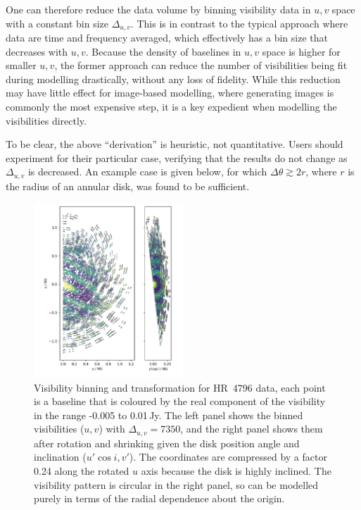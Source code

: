 \documentclass[fleqn,usenatbib]{mnras}
\begin{document}
One can therefore reduce the data volume by binning visibility data in $u,v$ space with a constant bin size $\Delta_{u,v}$. This is in contrast to the typical approach where data are time and frequency averaged, which effectively has a bin size that decreases with $u,v$. Because the density of baselines in $u,v$ space is higher for smaller $u,v$, the former approach can reduce the number of visibilities being fit during modelling drastically, without any loss of fidelity. While this reduction may have little effect for image-based modelling, where generating images is commonly the most expensive step, it is a key expedient when modelling the visibilities directly.

To be clear, the above ``derivation'' is heuristic, not quantitative. Users should experiment for their particular case, verifying that the results do not change as $\Delta_{u,v}$ is decreased. An example case is given below, for which $\Delta \theta \gtrsim 2r$, where $r$ is the radius of an annular disk, was found to be sufficient.

\begin{figure}
    \centering
    \hspace{-0.5cm}\includegraphics[width=0.5\textwidth]{vis_avg.png}
    \caption{Visibility binning and transformation for HR~4796 data, each point is a baseline that is coloured by the real component of the visibility in the range -0.005 to 0.01\,Jy. The left panel shows the binned visibilities ($u, v$) with $\Delta_{u,v}=7350$, and the right panel shows them after rotation and shrinking given the disk position angle and inclination ($u' \cos i, v'$). The coordinates are compressed by a factor 0.24 along the rotated $u$ axis because the disk is highly inclined. The visibility pattern is circular in the right panel, so can be modelled purely in terms of the radial dependence about the origin.}
    \label{fig:bin}
\end{figure}
\end{document}

